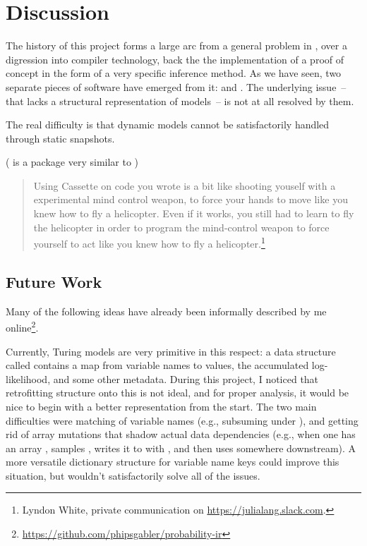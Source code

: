 \chapter{Discussion}
\label{cha:discussion}

The history of this project forms a large arc from a general problem in \turingjl{}, over a
digression into compiler technology, back the the implementation of a proof of concept in the form
of a very specific inference method.  As we have seen, two separate pieces of software have emerged
from it: \irtrackerjl{} and \autogibbsjl{}.  The underlying issue~-- that \turingjl{} lacks a
structural representation of models~-- is not at all resolved by them.

The real difficulty is that dynamic models cannot be satisfactorily handled through static
snapshots. 

( is a package very similar to )
\begin{quote}
  Using Cassette on code you wrote is a bit like shooting youself with a experimental mind control
  weapon, to force your hands to move like you knew how to fly a helicopter. Even if it works, you
  still had to learn to fly the helicopter in order to program the mind-control weapon to force
  yourself to act like you knew how to fly a helicopter.\footnote{Lyndon White, private
    communication on \protect\url{https://julialang.slack.com}.}
\end{quote}




\section{Future Work}
\label{sec:future-work}

Many of the following ideas have already been informally described by me
online\footnote{\protect\url{https://github.com/phipsgabler/probability-ir}}.

Currently, Turing models are very primitive in this respect: a data structure called 
contains a map from variable names to values, the accumulated log-likelihood, and some other
metadata. During this project, I noticed that retrofitting structure onto this is not ideal, and for
proper analysis, it would be nice to begin with a better representation from the start. The two main
difficulties were matching of variable names (e.g., subsuming  under
), and getting rid of array mutations that shadow actual data dependencies (e.g.,
when one has an array , samples , writes it to  with
, and then uses  somewhere downstream).  A more versatile
dictionary structure for variable name keys could improve this situation, but wouldn't
satisfactorily solve all of the issues.

